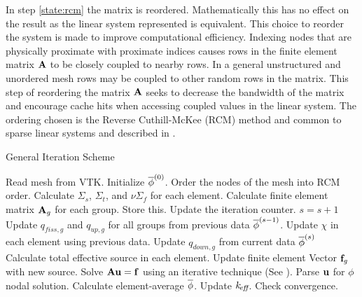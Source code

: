     In step \ref{state:rcm} the matrix is reordered. Mathematically this has no
    effect on the result as the linear system represented is equivalent. This 
    choice to reorder the system is made to improve computational efficiency. 
    Indexing nodes that are physically proximate with proximate indices causes 
    rows in the finite element matrix $\mathbf{A}$ to be closely coupled to nearby
    rows. In a general unstructured and unordered mesh rows may be coupled to 
    other random rows in the matrix. This step of reordering the matrix $\mathbf{A}$ 
    seeks to decrease the bandwidth of the matrix and encourage cache hits when
    accessing coupled values in the linear system. The ordering chosen is the
    Reverse Cuthill-McKee (RCM) method and common to sparse linear systems and 
    described in \cite{rcm}.
    
    \begin{algorithm}
      \caption{General Iteration Scheme}
      \label{algorithm:general}
      \begin{algorithmic}[1]
      \State Read mesh from VTK.
      \State Initialize $\overline{\phi}^{(0)}$.
      \State Order the nodes of the mesh into RCM order.
        \label{state:rcm}
      \State Calculate $\Sigma_s$, $\Sigma_t$, and $\nu \Sigma_f$ for each 
        element.
      \State Calculate finite element matrix $\mathbf{A}_g$ for each group. Store this. 
        \label{state:fem_matrix}
        \State Update the iteration counter. $s=s+1$
        \State Update $q_{fiss,g}$ and $q_{up,g}$ for all groups from previous 
          data $\overline{\phi}^{(s-1)}$.
        \State Update $\chi$ in each element using previous data.
          \label{state:chi_collapse}
          \State Update $q_{down,g}$ from current data $\overline{\phi}^{(s)}$
          \State Calculate total effective source in each element.
          \State Update finite element Vector $\mathbf{f}_g$ with new source.
            \label{state:fem_vector}
          \State Solve $\mathbf{A} \mathbf{u} = \mathbf{f}$ using an iterative technique (See
            ).
          \State Parse $\mathbf{u}$ for $\phi$ nodal solution.
          \State Calculate element-average $\overline{\phi}$.
        \EndFor
        \State Update $k_{\!\mbox{\scriptsize \em eff}}$.
        \State Check convergence.
      \EndWhile
      \end{algorithmic}
    \end{algorithm}

